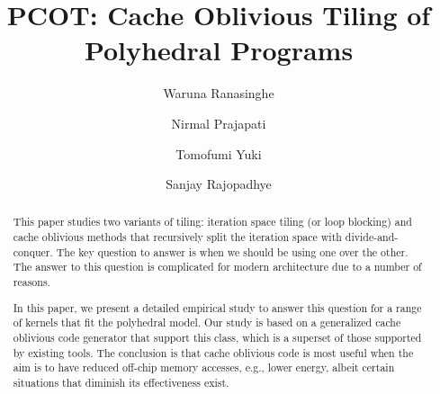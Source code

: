 \documentclass[sigconf, authordraft=false]{acmart}
\begin{document}
\title{PCOT: Cache Oblivious Tiling
of Polyhedral Programs}
\author{Waruna Ranasinghe}
\author{Nirmal Prajapati}
\author{Tomofumi Yuki}
\author{Sanjay Rajopadhye}
\begin{abstract}
  This paper studies two variants of tiling: iteration space tiling (or loop
  blocking) and cache oblivious methods that recursively split the iteration
  space with divide-and-conquer. The key question to answer is when
  we should be using one over the other. The answer to this question is complicated
  for modern architecture due to a number of reasons.

  In this paper, we present a detailed empirical study to answer this question for a range of kernels
  that fit the polyhedral model. Our study is based on a generalized cache oblivious code generator that
  support this class, which is a superset of those supported by existing tools.
  The conclusion is that cache oblivious code is most useful when the aim is to
  have reduced off-chip memory accesses, e.g., lower energy,
  albeit certain situations that diminish its effectiveness exist. 
\end{abstract}
%
%
\end{document}
